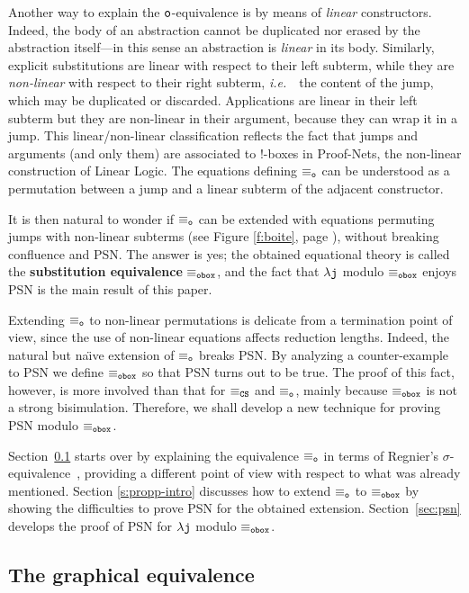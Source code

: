 \documentclass{LMCS}
\newcommand{\ie}{{\it  i.e.}~}
\renewcommand{\>}{\rightarrow}
\def\lam{\lambda}
\newcommand{\dis}{{\tt j}}
\newcommand{\ldis}{\lam{\dis}}
\newcommand{\CS}{{\tt CS}}
\newcommand{\eqw}[1]{\equiv_{#1}}
\newcommand{\eqo}{\equiv_\osym}
\newcommand{\osym}{{\tt o}}
\newcommand{\fsymb}{\osymb\boite}
\newcommand{\osymb}{{\tt o}}
\newcommand{\eqf}{\eqw{\fsymb}}
\newcommand{\eqcs}{\equiv_\CS}
\newcommand{\boite}{{\tt box}}
\begin{document}
Another way to explain the  $\osym$-equivalence 
is by  means of \textit{linear} constructors. Indeed, 
the body of an abstraction cannot be duplicated nor erased by the
abstraction itself---in this sense an abstraction is \textit{linear}
in its body. Similarly, explicit substitutions are linear with
respect to their left subterm, while they are \textit{non-linear} with
respect to their right subterm, \ie\ the content of the jump, which may be
duplicated or discarded. Applications are linear in their left
subterm but they are non-linear in their argument, 
because they can wrap
it in a jump. This linear/non-linear classification reflects the fact
that jumps and arguments (and only them) are associated
to $!$-boxes in Proof-Nets, the non-linear construction of Linear Logic.  The
equations defining $\eqo$ can be understood as a permutation between a jump 
and a linear subterm of the
adjacent constructor.

It is then natural to wonder if $\eqo$ can be extended with
equations permuting jumps with non-linear subterms (see Figure
\ref{f:boite}, page \pageref{f:boite}), without breaking confluence
and PSN. The answer is yes; the obtained equational
theory is called the \textbf{substitution equivalence} $\eqf$, and the
fact that $\ldis$ modulo $\eqf$ enjoys PSN is the main result of this
paper.\medskip

Extending $\eqo$ to non-linear permutations
is delicate from a termination point of view, since the use of
non-linear equations affects reduction lengths. Indeed, the natural
but na\"{\i}ve extension of $\eqo$ breaks PSN. By analyzing a
counter-example to PSN we define $\eqf$ so that PSN turns out to be true. The
proof of this fact, however, is more involved than that for $\eqcs$ and
$\eqo$, mainly because $\eqf$ is not a strong bisimulation.
Therefore, we shall develop a new technique for proving
PSN modulo $\eqf$.\medskip

Section~\ref{s:regnier} starts over by explaining
the equivalence $\eqo$ in terms of Regnier's $\sigma$-equivalence~\cite{regnier94}, 
providing a different point of view with respect to what was already
mentioned. Section \ref{s:propp-intro} discusses 
how to extend $\eqo$ to $\eqf$ by
    showing the difficulties to prove PSN for  the obtained extension.  Section~\ref{sec:psn} develops the proof of PSN for $\ldis$ modulo $\eqf$.


\subsection{The graphical equivalence}
\label{s:regnier}
\end{document}
